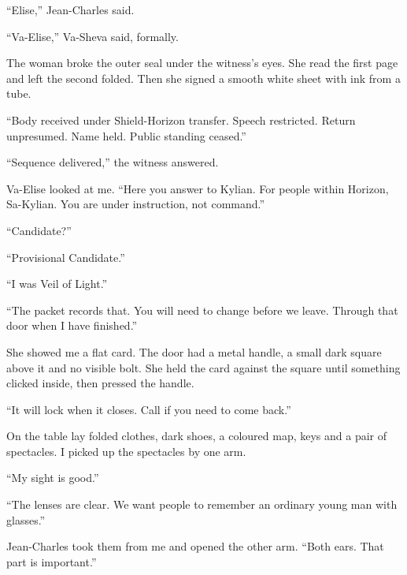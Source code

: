 ``Elise,'' Jean-Charles said.\par

``Va-Elise,'' Va-Sheva said, formally.\par

The woman broke the outer seal under the witness's eyes. She read the first page and left the second folded. Then she signed a smooth white sheet with ink from a tube.\par

``Body received under Shield-Horizon transfer. Speech restricted. Return unpresumed. Name held. Public standing ceased.''\par

``Sequence delivered,'' the witness answered.\par

Va-Elise looked at me. ``Here you answer to Kylian. For people within Horizon, Sa-Kylian. You are under instruction, not command.''\par

``Candidate?''\par

``Provisional Candidate.''\par

``I was Veil of Light.''\par

``The packet records that. You will need to change before we leave. Through that door when I have finished.''\par

She showed me a flat card. The door had a metal handle, a small dark square above it and no visible bolt. She held the card against the square until something clicked inside, then pressed the handle.\par

``It will lock when it closes. Call if you need to come back.''\par

On the table lay folded clothes, dark shoes, a coloured map, keys and a pair of spectacles. I picked up the spectacles by one arm.\par

``My sight is good.''\par

``The lenses are clear. We want people to remember an ordinary young man with glasses.''\par

Jean-Charles took them from me and opened the other arm. ``Both ears. That part is important.''\par

